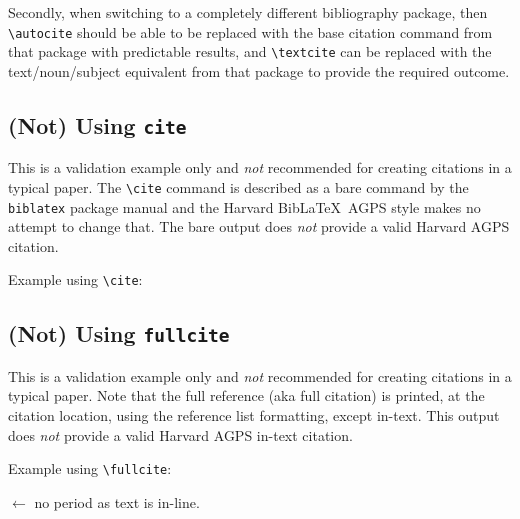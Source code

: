 \documentclass[a4paper, 11pt]{article}
\newcommand*{\BibLaTeX}{Bib\LaTeX}
\newcommand*{\subsectionRefSection}[1]{
    \subsection{#1}
    \refsection
}
\newcommand*{\printsubbibliographyEndRefSection}{
    \printbibliography[heading=subbibliography, title=Reference]
    \endrefsection
}
\newenvironment{agpsExample}{
    \setlength{\parindent}{0pt}
    \medskip
}
{}
\newenvironment{bareList}{%
    \begin{list}{}{}%
}
{\end{list}}
\begin{document}
Secondly, when switching to a completely different bibliography package, then \verb|\autocite|
should be able to be replaced with the base citation command from that package with predictable
results, and \verb|\textcite| can be replaced with the text/noun/subject equivalent from that
package to provide the required outcome.

\subsection{(Not) Using \texttt{cite}}

This is a validation example only and \emph{not} recommended for creating citations in a typical
paper. The \verb|\cite| command is described as a bare command by the \texttt{biblatex} package
manual \autocite[110]{KimeEtAl2022biblatPackag} and the Harvard \BibLaTeX\ AGPS style makes no
attempt to change that. The bare output does \emph{not} provide a valid Harvard AGPS citation.


\begin{agpsExample}

    Example using \verb|\cite|:

    \begin{bareList}
        \item \cite{Smith1985MicroePolicyFramew}
    \end{bareList}

\end{agpsExample}

\printsubbibliographyEndRefSection

\subsectionRefSection{(Not) Using \texttt{fullcite}}

This is a validation example only and \emph{not} recommended for creating citations in a typical
paper. Note that the full reference (aka full citation) is printed, at the citation location, using
the reference list formatting, except in-text. This output does \emph{not} provide a valid Harvard
AGPS in-text citation.

\begin{agpsExample}

    Example using \verb|\fullcite|:

    \begin{bareList}
        \item {} $\leftarrow$ no period as text is in-line.
    \end{bareList}

\end{agpsExample}
\end{document}
